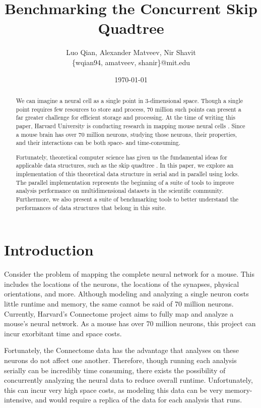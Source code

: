 \documentclass[10pt]{article}
\begin{document}
%
\title{\textbf{Benchmarking the Concurrent Skip Quadtree}}
\author{Luo Qian, Alexander Matveev, Nir Shavit\\
\{wqian94, amatveev, shanir\}@mit.edu}
\date{\today}
\thispagestyle{empty}
\twocolumn[\maketitle]
\begin{abstract}
We can imagine a neural cell as a single point in 3-dimensional space. Though a single point requires few resources to store and process, 70 million such points can present a far greater challenge for efficient storage and processing. At the time of writing this paper, Harvard University is conducting research in mapping mouse neural cells \cite{connectome}. Since a mouse brain has over 70 million neurons, studying those neurons, their properties, and their interactions can be both space- and time-consuming.

Fortunately, theoretical computer science has given us the fundamental ideas for applicable data structures, such as the skip quadtree \cite{sqt}. In this paper, we explore an implementation of this theoretical data structure in serial and in parallel using locks. The parallel implementation represents the beginning of a suite of tools to improve analysis performance on multidimensional datasets in the scientific community. Furthermore, we also present a suite of benchmarking tools to better understand the performances of data structures that belong in this suite.
\end{abstract}

\section{Introduction}

Consider the problem of mapping the complete neural network for a mouse. This includes the locations of the neurons, the locations of the synapses, physical orientations, and more. Although modeling and analyzing a single neuron costs little runtime and memory, the same cannot be said of 70 million neurons. Currently, Harvard's Connectome project \cite{connectome} aims to fully map and analyze a mouse's neural network. As a mouse has over 70 million neurons, this project can incur exorbitant time and space costs.

Fortunately, the Connectome data has the advantage that analyses on these neurons do not affect one another. Therefore, though running each analysis serially can be incredibly time consuming, there exists the possibility of concurrently analyzing the neural data to reduce overall runtime. Unfortunately, this can incur very high space costs, as modeling this data can be very memory-intensive, and would require a replica of the data for each analysis that runs.
\end{document}

